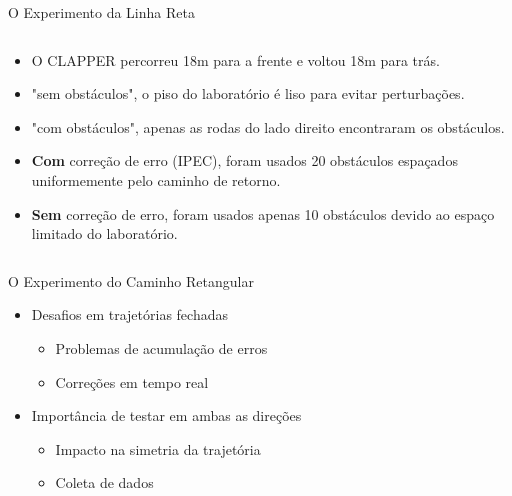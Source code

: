 \documentclass[xcolor=dvipsnames, aspectratio=169]{beamer}
\begin{document}
\begin{frame}{O Experimento da Linha Reta}
\begin{columns}
    \begin{column}{0.5\textwidth}
      \begin{itemize}
        \item O CLAPPER percorreu 18m para a frente e voltou 18m para trás.
        \item "sem obstáculos", o piso do laboratório é liso para evitar perturbações.
        \item "com obstáculos", apenas as rodas do lado direito encontraram os obstáculos.
        \item \textbf{Com} correção de erro (IPEC), foram usados 20 obstáculos espaçados uniformemente pelo caminho de retorno.
        \item \textbf{Sem} correção de erro, foram usados apenas 10 obstáculos devido ao espaço limitado do laboratório.
      \end{itemize}      
    \end{column}
  \end{columns}
\end{frame}

\begin{frame}{O Experimento do Caminho Retangular}
  \begin{itemize}
    \item Desafios em trajetórias fechadas
      \begin{itemize}
        \item Problemas de acumulação de erros
        \item Correções em tempo real
      \end{itemize}
    \item Importância de testar em ambas as direções
      \begin{itemize}
        \item Impacto na simetria da trajetória
        \item Coleta de dados
      \end{itemize}
  \end{itemize}
\end{frame}

\end{document}
